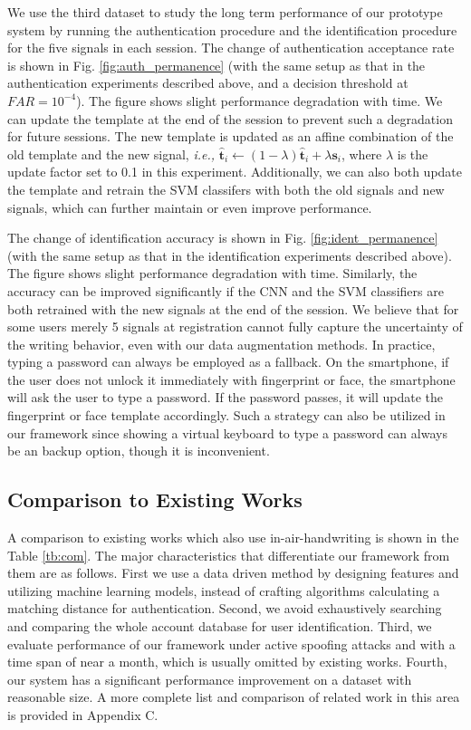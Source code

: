 \documentclass[conference]{IEEEtran}
\begin{document}
We use the third dataset to study the long term performance of our prototype system by running the authentication procedure and the identification procedure for the five signals in each session. The change of authentication acceptance rate is shown in Fig. \ref{fig:auth_permanence} (with the same setup as that in the authentication experiments described above, and a decision threshold at $FAR = 10^{-4}$). The figure shows slight performance degradation with time. We can update the template at the end of the session to prevent such a degradation for future sessions. The new template is updated as an affine combination of the old template and the new signal, \textit{i.e.,} $\hat{\mathbf{t}}_i \leftarrow (1 - \lambda) \hat{\mathbf{t}}_i + \lambda \mathbf{s}_i$, where $\lambda$ is the update factor set to 0.1 in this experiment. Additionally, we can also both update the template and retrain the SVM classifers with both the old signals and new signals, which can further maintain or even improve performance. 

The change of identification accuracy is shown in Fig. \ref{fig:ident_permanence} (with the same setup as that in the identification experiments described above). The figure shows slight performance degradation with time. Similarly, the accuracy can be improved significantly if the CNN and the SVM classifiers are both retrained with the new signals at the end of the session. We believe that for some users merely 5 signals at registration cannot fully capture the uncertainty of the writing behavior, even with our data augmentation methods. In practice, typing a password can always be employed as a fallback. On the smartphone, if the user does not unlock it immediately with fingerprint or face, the smartphone will ask the user to type a password. If the password passes, it will update the fingerprint or face template accordingly. Such a strategy can also be utilized in our framework since showing a virtual keyboard to type a password can always be an backup option, though it is inconvenient.


\subsection{Comparison to Existing Works}

A comparison to existing works which also use in-air-handwriting is shown in the Table \ref{tb:com}. The major characteristics that differentiate our framework from them are as follows. First we use a data driven method by designing features and utilizing machine learning models, instead of crafting algorithms calculating a matching distance for authentication. Second, we avoid exhaustively searching and comparing the whole account database for user identification. Third, we evaluate performance of our framework under active spoofing attacks and with a time span of near a month, which is usually omitted by existing works. Fourth, our system has a significant performance improvement on a dataset with reasonable size. A more complete list and comparison of related work in this area is provided in Appendix C.
\end{document}

